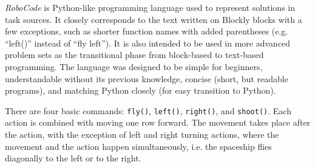 \emph{RoboCode} is Python-like programming language
used to represent solutions in task sources.
It closely corresponds to the text written on Blockly blocks
with a few exceptions, such as %
shorter function names with added parentheses
(e.g. ``left()'' instead of ``fly left'').
It is also intended to be used in more advanced problem sets as the
transitional phase from block-based to text-based programming.
The language was designed %
to be simple for beginners, understandable without its previous knowledge,
concise (short, but readable programs),
and matching Python closely (for easy transition to Python).



There are four basic commands: %
\texttt{fly()},
\texttt{left()},
\texttt{right()}, and
\texttt{shoot()}.
Each action is combined with moving one row forward.
The movement takes place after the action, with the exception of left and right turning actions, where the movement and the action happen simultaneously,
i.e. the spaceship flies diagonally to the left or to the right.

